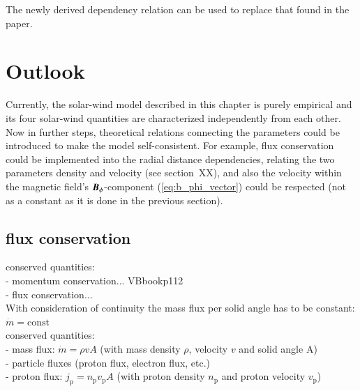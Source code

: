 The newly derived dependency relation can be used to replace that found in the paper.\\


\section{Outlook}
Currently, the solar-wind model described in this chapter is purely empirical and its four solar-wind quantities are characterized independently from each other. Now in further steps, theoretical relations connecting the parameters could be introduced to make the model self-consistent. For example, flux conservation could be implemented into the radial distance dependencies, relating the two parameters density and velocity (see section~XX), and also the velocity within the magnetic field's $\boldsymbol{B}_\phi$-component (\ref{eq:b_phi_vector}) could be respected (not as a constant as it is done in the previous section).\\


\subsection{flux conservation}
conserved quantities:\\
- momentum conservation... VBbookp112\\
- flux conservation...\\



With consideration of continuity the mass flux per solid angle has to be constant: $\dot{m} = \text{const}$\\
conserved quantities:\\
- mass flux: $\dot{m} = \rho v A$ (with mass density $\rho$, velocity $v$ and solid angle A)\\
- particle fluxes (proton flux, electron flux, etc.)\\
	- proton flux: $j_\text{p} = n_\text{p} v_\text{p} A$ (with proton density $n_\text{p}$ and proton velocity $v_\text{p}$)\\

